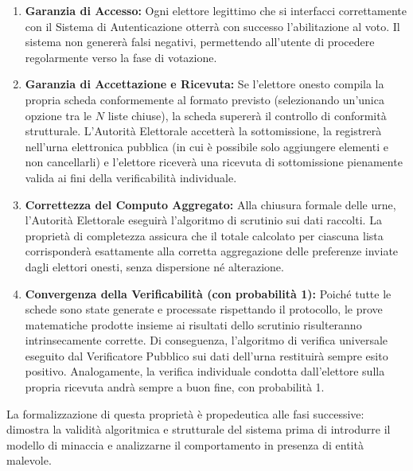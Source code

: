 \begin{enumerate}
    \item \textbf{Garanzia di Accesso:} Ogni elettore legittimo che si interfacci correttamente con il Sistema di Autenticazione otterrà con successo l'abilitazione al voto. Il sistema non genererà falsi negativi, permettendo all'utente di procedere regolarmente verso la fase di votazione.
    
    \item \textbf{Garanzia di Accettazione e Ricevuta:} Se l'elettore onesto compila la propria scheda conformemente al formato previsto (selezionando un'unica opzione tra le $N$ liste chiuse), la scheda supererà il controllo di conformità strutturale. L'Autorità Elettorale accetterà la sottomissione, la registrerà nell'urna elettronica pubblica (in cui è possibile solo aggiungere elementi e non cancellarli) e l'elettore riceverà una ricevuta di sottomissione pienamente valida ai fini della verificabilità individuale.
    
    \item \textbf{Correttezza del Computo Aggregato:} Alla chiusura formale delle urne, l'Autorità Elettorale eseguirà l'algoritmo di scrutinio sui dati raccolti. La proprietà di completezza assicura che il totale calcolato per ciascuna lista corrisponderà esattamente alla corretta aggregazione delle preferenze inviate dagli elettori onesti, senza dispersione né alterazione.
    
    \item \textbf{Convergenza della Verificabilità (con probabilità 1):} Poiché tutte le schede sono state generate e processate rispettando il protocollo, le prove matematiche prodotte insieme ai risultati dello scrutinio risulteranno intrinsecamente corrette. Di conseguenza, l'algoritmo di verifica universale eseguito dal Verificatore Pubblico sui dati dell'urna restituirà sempre esito positivo. Analogamente, la verifica individuale condotta dall'elettore sulla propria ricevuta andrà sempre a buon fine, con probabilità 1.
\end{enumerate}

\noindent
La formalizzazione di questa proprietà è propedeutica alle fasi successive: dimostra la validità algoritmica e strutturale del sistema prima di introdurre il modello di minaccia e analizzarne il comportamento in presenza di entità malevole.